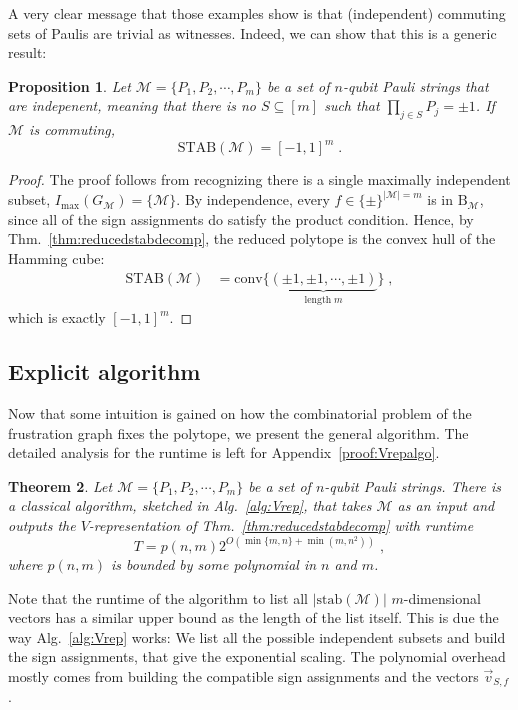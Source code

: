 \documentclass[10pt,aps,pra,twocolumn,floatfix,nofootinbib,superscriptaddress,longbibliography]{revtex4-2}
\newcommand{\1}{\mathbbm{1}}
\newtheorem{thm}{Theorem}
\newtheorem{prop}[thm]{Proposition}
\begin{document}
A very clear message that those examples show is that (independent) commuting sets of Paulis are trivial as witnesses. Indeed, we can show that this is a generic result:
\begin{prop}
    Let $\mathcal M =\{P_1, P_2, \cdots, P_m\}$ be a set of $n$-qubit Pauli strings that are indepenent, meaning that there is no $S \subseteq [m]$ such that $ \prod_{j \in S}P_j=\pm 1 $. If $\mathcal M$ is commuting,
    \begin{equation}
        \mathrm{STAB}(\mathcal M) =[-1,1]^{m}\;.
    \end{equation}
\end{prop}
\begin{proof}
    The proof follows from recognizing there is a single maximally independent subset, $I_\mathrm{max}(G_\mathcal M) = \{\mathcal M\}$. By independence, every $f \in \{\pm\}^{|\mathcal M|=m}$ is in $\mathrm B_\mathcal M$, since all of the sign assignments do satisfy the product condition. Hence, by Thm.~\ref{thm:reducedstabdecomp}, the reduced polytope is the convex hull of the Hamming cube:
    \begin{align}
    \mathrm{STAB}(\mathcal M) &=\mathrm{conv}\{\underbrace{(\pm 1, \pm 1, \cdots, \pm 1)}_{\mathrm{length\;}m}\}\;,  
    \end{align}
    which is exactly $[-1,1]^m$.
\end{proof}


\subsection{Explicit algorithm~\label{sec:algoreducedstab}}
Now that some intuition is gained on how the combinatorial problem of the frustration graph fixes the polytope, we present the general algorithm. The detailed analysis for the runtime is left for Appendix~\ref{proof:Vrepalgo}.
\begin{thm}
    Let $\mathcal M =\{P_1,P_2, \cdots, P_m\}$ be a set of $n$-qubit Pauli strings. There is a classical algorithm, sketched in Alg.~\ref{alg:Vrep}, that takes $\mathcal M$ as an input and outputs the $V$-representation of Thm.~\ref{thm:reducedstabdecomp} with runtime
    \begin{equation}
        T = p(n,m)2^{O(\min\{m,n\}+ \min(m,n^2))}\;,
    \end{equation}
    where $p(n,m)$ is bounded by some polynomial in $n$ and $m$.
    \label{thm:Vrepalgo}
\end{thm}
Note that the runtime of the algorithm to list all $|\mathrm{stab}(\mathcal M)|$ $m$-dimensional vectors has a similar upper bound as the length of the list itself. This is due the way Alg.~\ref{alg:Vrep} works: We list all the possible independent subsets and build the sign assignments, that give the exponential scaling. The polynomial overhead mostly comes from building the compatible sign assignments and the vectors $\vec v_{S,f}$.
\end{document}
